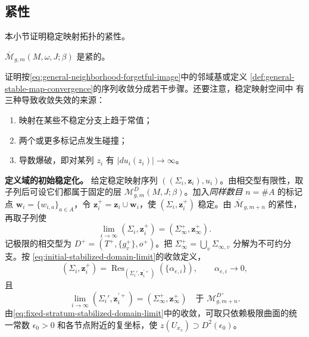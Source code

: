\subsection{紧性}
\label{subsec:stable-map-compactness}

本小节证明稳定映射拓扑的紧性。

\begin{theorem}\label{thm:gromov-compactness-stable-maps}
$\overline{\mathcal M}_{g,m}(M,\omega,J;\beta)$ 是紧的。
\end{theorem}

证明按\eqref{eq:general-neighborhood-forgetful-image}中的邻域基或定义
\ref{def:general-stable-map-convergence}的序列收敛分成若干步骤。还要注意，稳定映射空间中
有三种导致收敛失效的来源：
\begin{enumerate}[label=(\arabic*)]
 \item 映射在某些不稳定分支上趋于常值；
 \item 两个或更多标记点发生碰撞；
 \item 导数爆破，即对某列 $z_i$ 有 $|du_i(z_i)|\to\infty$。
\end{enumerate}

\textbf{定义域的初始稳定化。}
给定稳定映射序列 $((\Sigma_i,\boldsymbol z_i),u_i)$。由相交型有限性，取子列后可设它们都属于固定的层
$\mathcal M_{g,m}^D(M,J;\beta)$。加入\emph{同样数目} $n=\#A$ 的标记点
$\boldsymbol w_i=\{w_{i,a}\}_{a\in A}$，令
$\boldsymbol z_i^+=\boldsymbol z_i\cup\boldsymbol w_i$，使
$(\Sigma_i,\boldsymbol z_i^+)$ 稳定。由
$\overline{\mathcal M}_{g,m+n}$ 的紧性，再取子列使
\begin{equation}
 \lim_{i\to\infty}(\Sigma_i,\boldsymbol z_i^+)
 =(\Sigma_\infty^+,\boldsymbol z_\infty^+).
 \label{eq:initial-stabilized-domain-limit}
\end{equation}
记极限的相交型为 $D^+=(T^+,\{g_v^+\},o^+)$。把
$\Sigma_\infty^+=\bigcup_v\Sigma_{\infty,v}$ 分解为不可约分支。按
\eqref{eq:initial-stabilized-domain-limit}的收敛定义，
\[
 (\Sigma_i,\boldsymbol z_i^+)=
 \operatorname{Res}_{(\Sigma_i',\boldsymbol z_i^{\prime+})}
 (\{\alpha_{e,i}\}),
 \qquad \alpha_{e,i}\to0,
\]
且
\begin{equation}
 \lim_{i\to\infty}(\Sigma_i',\boldsymbol z_i^{\prime+})
 =(\Sigma_\infty^+,\boldsymbol z_\infty^+)
 \quad\text{于 }\mathcal M_{g,m+n}^{D^+}.
 \label{eq:fixed-stratum-stabilized-domain-limit}
\end{equation}
由\eqref{eq:fixed-stratum-stabilized-domain-limit}中的收敛，可取只依赖极限曲面的统一常数 $\epsilon_0>0$ 和各节点附近的复坐标，使
$z(U_{x_v})\supset D^2(\epsilon_0)$。

